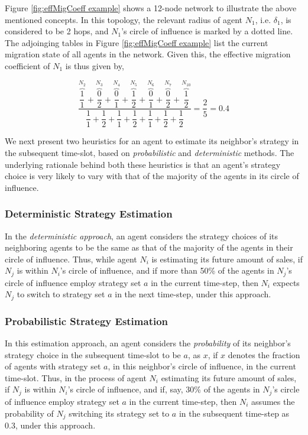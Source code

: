 \documentclass[smallextended]{svjour3}
\begin{document}
Figure \ref{fig:effMigCoeff example} shows a 12-node network to illustrate the
above mentioned concepts. In this topology, the relevant radius of agent $N_1$,
i.e. $\delta_1$, is considered to be 2 hops, and $N_1$'s circle of influence
is marked by a dotted line. The adjoinging tables in Figure
\ref{fig:effMigCoeff example} list the current migration state of all agents
in the network. Given this, the effective migration coefficient of $N_1$ is
thus given by,

$$
\dfrac{\overbrace{\dfrac{1}{1}}^{N_2}+\overbrace{\dfrac{0}{2}}^{N_3}+\overbrace{\dfrac{0}{1}}^{N_4}+\overbrace{\dfrac{1}{2}}^{N_5}+\overbrace{\dfrac{0}{1}}^{N_6}+\overbrace{\dfrac{0}{2}}^{N_7}+\overbrace{\dfrac{1}{2}}^{N_{10}}}{\dfrac{1}{1}+\dfrac{1}{2}+\dfrac{1}{1}+\dfrac{1}{2}+\dfrac{1}{1}+\dfrac{1}{2}+\dfrac{1}{2}}=\dfrac{2}{5}=0.4
$$

\par We next present two
heuristics for an agent to estimate its neighbor's strategy in the subsequent
time-slot, based on \emph{probabilistic} and \emph{deterministic} methods. The
underlying rationale behind both these heuristics is that an agent's strategy
choice is very likely to vary with that of the majority of the agents in its
circle of influence.

\subsubsection{Deterministic Strategy Estimation} In the \emph{deterministic approach}, an
agent considers the strategy choices of its neighboring agents to be the same as
that of the majority of the agents in their circle of influence. Thus, while
agent $N_i$ is estimating its future amount of sales, if $N_j$ is within $N_i$'s
circle of influence, and if more than 50\% of the agents in $N_j$'s circle of
influence employ strategy set $a$ in the current time-step, then $N_i$ expects
$N_j$ to switch to strategy set $a$ in the next time-step, under this
approach.

\subsubsection{Probabilistic Strategy Estimation} In this estimation approach,
an agent considers the \emph{probability} of its neighbor's strategy choice in
the subsequent time-slot to be $a$, as $x$, if $x$ denotes the fraction of
agents with strategy set $a$, in this neighbor's circle of influence, in the
current time-slot. Thus, in the process of agent $N_i$ estimating its future
amount of sales, if $N_j$ is within $N_i$'s circle of influence, and if, say,
30\% of the agents in $N_j$'s circle of influence employ strategy set $a$ in the
current time-step, then $N_i$ assumes the probability of $N_j$ switching its
strategy set to $a$ in the subsequent time-step as 0.3, under this approach.
\end{document}
